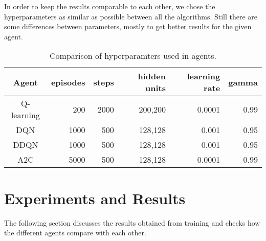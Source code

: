 \documentclass[11pt,a4paper]{article}
\begin{document}
In order to keep the results comparable to each other, we chose the hyperparameters as similar as possible between all the algorithms. Still there are some differences between parameters, mostly to get better results for the given agent.\\

\begin{table}[h]
    \centering
    \begin{tabular}{|c|r|r|r|r|r|}
         Agent & episodes & steps & hidden units & learning rate & gamma\\
         \hline
         Q-learning & 200 & 2000 & 200,200 & 0.0001 & 0.99\\
         DQN & 1000 & 500 & 128,128 & 0.001 & 0.95\\
         DDQN & 1000 & 500 & 128,128 & 0.001 & 0.95\\
         A2C & 5000 & 500 & 128,128 & 0.0001 & 0.99\\
    \end{tabular}
    \caption{Comparison of hyperparamters used in agents.}
    \label{tab:comparison_hyper}
\end{table}


\section{Experiments and Results}
\label{sec:exp}
The following section discusses the results obtained from training and checks how the different agents compare with each other. 
\end{document}
